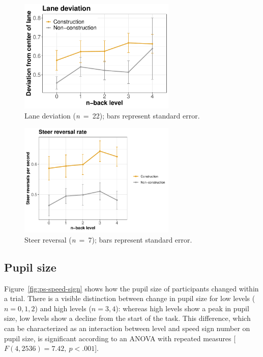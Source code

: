 \begin{figure}
  \centering
  \includegraphics[width=7.5cm]{images/lane_deviation.pdf}
  \caption{Lane deviation (\textit{n}\ =\ 22); bars represent standard error.}
  \label{fig:lane-deviation}
\end{figure}

\begin{figure}
  \centering
  \includegraphics[width=7.5cm]{images/steer_reversal.pdf}
  \caption{Steer reversal (\textit{n}\ =\ 7); bars represent standard error.}
  \label{fig:steer-reversal}
\end{figure}

\subsection{Pupil size}
Figure~\ref{fig:ps-speed-sign} shows how the pupil size of participants changed within a trial.
There is a visible distinction between change in pupil size for low \nback levels (\(n = 0,1,2\)) and high \nback levels (\(n = 3,4\)):
whereas high \nback levels show a peak in pupil size, low \nback levels show a decline from the start of the task.
This difference, which can be characterized as an interaction between \nback level and speed sign number on pupil size, is significant according to an ANOVA with repeated measures [\(F(4,2536)=7.42,\ p < .001\)].


